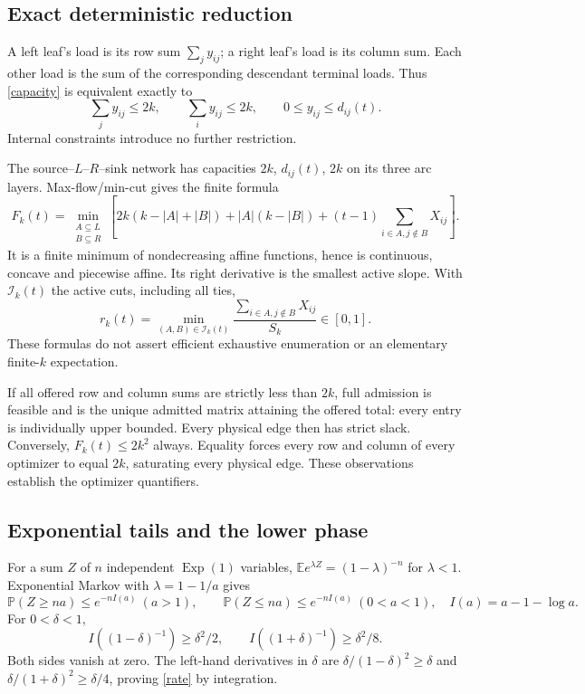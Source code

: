 \documentclass[10pt]{article}
\newcommand{\Pp}{\mathbb P}
\newcommand{\E}{\mathbb E}
\begin{document}
\subsection{Exact deterministic reduction}
A left leaf's load is its row sum \(\sum_jy_{ij}\); a right leaf's load
is its column sum. Each other load is the sum of the corresponding
descendant terminal loads. Thus \eqref{capacity} is equivalent exactly to
\begin{equation}\label{constraints}
 \sum_j y_{ij}\le2k,\qquad \sum_i y_{ij}\le2k,\qquad
 0\le y_{ij}\le d_{ij}(t).
\end{equation}
Internal constraints introduce no further restriction.

The source--\(L\)--\(R\)--sink network has capacities \(2k\),
\(d_{ij}(t)\), \(2k\) on its three arc layers. Max-flow/min-cut
\cite{FF} gives the finite formula
\begin{equation}\label{cut}
 F_k(t)=\min_{\substack{A\subseteq L\\B\subseteq R}}
 \left[2k(k-|A|+|B|)+|A|(k-|B|)
             +(t-1)\sum_{i\in A,j\notin B}X_{ij}\right].
\end{equation}
It is a finite minimum of nondecreasing affine functions, hence is
continuous, concave and piecewise affine. Its right derivative is the
smallest active slope. With \(\mathcal I_k(t)\) the active cuts, including
all ties,
\begin{equation}\label{marginal}
 r_k(t)=\min_{(A,B)\in\mathcal I_k(t)}
             \frac{\sum_{i\in A,j\notin B}X_{ij}}{S_k}\in[0,1].
\end{equation}
These formulas do not assert efficient exhaustive enumeration or an
elementary finite-\(k\) expectation.

If all offered row and column sums are strictly less than \(2k\), full
admission is feasible and is the unique admitted matrix attaining the offered
total: every entry is individually upper bounded. Every physical edge
then has strict slack. Conversely, \(F_k(t)\le2k^2\) always. Equality forces
every row and column of every optimizer to equal \(2k\), saturating every
physical edge. These observations establish the optimizer quantifiers.

\subsection{Exponential tails and the lower phase}
For a sum \(Z\) of \(n\) independent \(\operatorname{Exp}(1)\) variables,
\(\E e^{\lambda Z}=(1-\lambda)^{-n}\) for \(\lambda<1\).
Exponential Markov with \(\lambda=1-1/a\) gives
\[
 \Pp(Z\ge na)\le e^{-nI(a)}\ (a>1),\qquad
 \Pp(Z\le na)\le e^{-nI(a)}\ (0<a<1),\quad I(a)=a-1-\log a.
\]
For \(0<\delta<1\),
\begin{equation}\label{rate}
 I((1-\delta)^{-1})\ge\delta^2/2,\qquad
 I((1+\delta)^{-1})\ge\delta^2/8.
\end{equation}
Both sides vanish at zero. The left-hand derivatives in \(\delta\) are
\(\delta/(1-\delta)^2\ge\delta\) and
\(\delta/(1+\delta)^2\ge\delta/4\), proving \eqref{rate} by integration.
\end{document}
